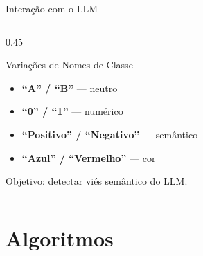 \documentclass[aspectratio=169, 8pt]{beamer}
\begin{document}
\begin{frame}[fragile]{Interação com o LLM}
\begin{columns}[T]
\begin{column}{0.45\textwidth}
      \vspace{0.1em}
      \begin{block}{Variações de Nomes de Classe}
        \begin{itemize}
          \scriptsize
          \item \textbf{``A'' / ``B''} --- neutro
          \item \textbf{``0'' / ``1''} --- numérico
          \item \textbf{``Positivo'' / ``Negativo''} --- semântico
          \item \textbf{``Azul'' / ``Vermelho''} --- cor
        \end{itemize}
        Objetivo: detectar viés semântico do LLM.
      \end{block}
    \end{column}
  \end{columns}
\end{frame}

\section{Algoritmos}
\end{document}
